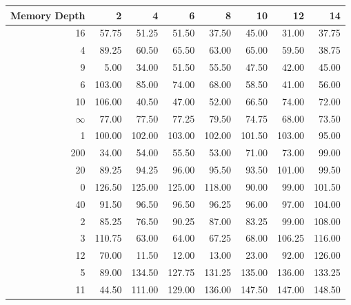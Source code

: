 \begin{tabular}{rrrrrrrr}
\toprule
 Memory Depth &       2 &       4 &       6 &       8 &      10 &      12 &      14 \\
\midrule
           16 &   57.75 &   51.25 &   51.50 &   37.50 &   45.00 &   31.00 &   37.75 \\
            4 &   89.25 &   60.50 &   65.50 &   63.00 &   65.00 &   59.50 &   38.75 \\
            9 &    5.00 &   34.00 &   51.50 &   55.50 &   47.50 &   42.00 &   45.00 \\
            6 &  103.00 &   85.00 &   74.00 &   68.00 &   58.50 &   41.00 &   56.00 \\
           10 &  106.00 &   40.50 &   47.00 &   52.00 &   66.50 &   74.00 &   72.00 \\
           $\infty$ &   77.00 &   77.50 &   77.25 &   79.50 &   74.75 &   68.00 &   73.50 \\
            1 &  100.00 &  102.00 &  103.00 &  102.00 &  101.50 &  103.00 &   95.00 \\
          200 &   34.00 &   54.00 &   55.50 &   53.00 &   71.00 &   73.00 &   99.00 \\
           20 &   89.25 &   94.25 &   96.00 &   95.50 &   93.50 &  101.00 &   99.50 \\
            0 &  126.50 &  125.00 &  125.00 &  118.00 &   90.00 &   99.00 &  101.50 \\
           40 &   91.50 &   96.50 &   96.50 &   96.25 &   96.00 &   97.00 &  104.00 \\
            2 &   85.25 &   76.50 &   90.25 &   87.00 &   83.25 &   99.00 &  108.00 \\
            3 &  110.75 &   63.00 &   64.00 &   67.25 &   68.00 &  106.25 &  116.00 \\
           12 &   70.00 &   11.50 &   12.00 &   13.00 &   23.00 &   92.00 &  126.00 \\
            5 &   89.00 &  134.50 &  127.75 &  131.25 &  135.00 &  136.00 &  133.25 \\
           11 &   44.50 &  111.00 &  129.00 &  136.00 &  147.50 &  147.00 &  148.50 \\
\bottomrule
\end{tabular}
